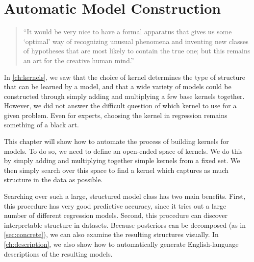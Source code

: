 
\inbpdocument


\chapter{Automatic Model Construction}%
\label{ch:grammar}

\begin{quotation}
``It would be very nice to have a formal apparatus that gives us some `optimal' way of recognizing unusual phenomena and inventing new classes of hypotheses that are most likely to contain the true one; but this remains an art for the creative human mind.''

\hspace*{\fill}
\end{quotation}


In \cref{ch:kernels}, we saw that the choice of kernel determines the type of structure that can be learned by a \gp{} model, and that a wide variety of models could be constructed through simply adding and multiplying a few base kernels together.
However, we did not answer the difficult question of which kernel to use for a given problem.
Even for experts, choosing the kernel in \gp{} regression remains something of a black art.

This chapter will show how to automate the process of building kernels for \gp{} models.
To do so, we need to define an open-ended space of kernels.
We do this by simply adding and multiplying together simple kernels from a fixed set.
We then simply search over this space to find a kernel which captures as much structure in the data as possible.

Searching over such a large, structured model class has two main benefits.
First, this procedure has very good predictive accuracy, since it tries out a large number of different regression models.
Second, this procedure can discover interpretable structure in datasets.
Because \gp{} posteriors can be decomposed (as in \cref{sec:concrete}), we can also examine the resulting structures visually.
In \cref{ch:description}, we also show how to automatically generate English-language descriptions of the resulting models.

